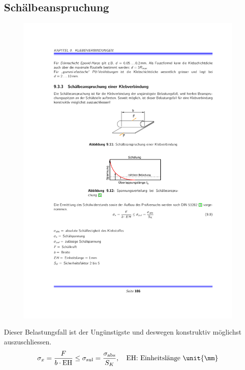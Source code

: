 	\subsection{Schälbeanspruchung} %
		\begin{figure}
			\vspace{-1.4cm}
			\includegraphics[width=.45\columnwidth]{graphics/klebe_schael}
		\end{figure}
		
		Dieser Belastungsfall ist der Un\-güns\-tigs\-te und deswegen konstruktiv mög\-lichst auszuschliessen.
		\begin{equation*}
			\sigma_x = \frac{F}{b \cdot \text{EH}} \leq \sigma_{\text{zul}} = \frac{\sigma_{\text{abs}}}{S_K}, \quad \text{EH: Einheitslänge \unit{\mm}}
		\end{equation*}
